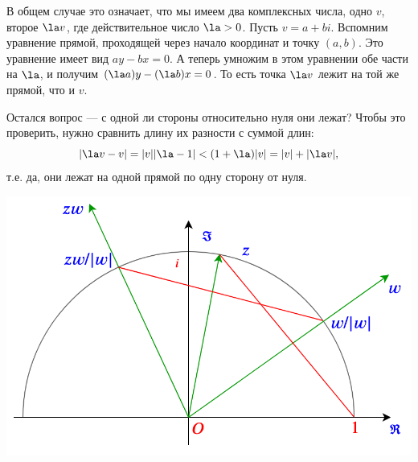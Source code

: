 \begin{enumerate}
В общем случае это означает, что мы имеем два комплексных числа, одно $v$, второе $\la v$, где действительное число $\la>0$. Пусть $v=a+bi$. Вспомним уравнение прямой, проходящей через начало координат и точку $(a,b)$. Это уравнение имеет вид $ay-bx=0$. А теперь умножим в этом уравнении обе части на $\la$, и получим $(\la a)y-(\la b)x=0$. То есть точка $\la v$ лежит на той же прямой, что и $v$.

Остался вопрос --- с одной ли стороны относительно нуля они лежат? Чтобы это проверить, нужно сравнить длину их разности с суммой длин:
$$
|\la v-v|=|v||\la-1|<(1+\la)|v|=|v|+|\la v|,
$$
т.е. да, они лежат на одной прямой по одну сторону от нуля.
\begin{center}
\includegraphics[scale=0.4]{complex-ring2.png}
\end{center}


\end{enumerate}
